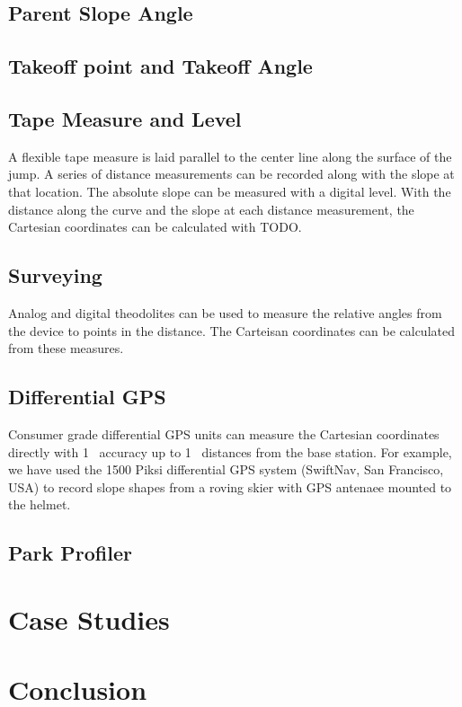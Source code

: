 \documentclass{article}
\begin{document}
\subsection{Parent Slope Angle}
%

\subsection{Takeoff point and Takeoff Angle}
%

\subsection{Tape Measure and Level}
%
A flexible tape measure is laid parallel to the center line along the surface
of the jump. A series of distance measurements can be recorded along with the
slope at that location. The absolute slope can be measured with a digital
level. With the distance along the curve and the slope at each distance
measurement, the Cartesian coordinates can be calculated with TODO.

\subsection{Surveying}
%
Analog and digital theodolites can be used to measure the relative angles from
the device to points in the distance. The Carteisan coordinates can be
calculated from these measures.

\subsection{Differential GPS}
%
Consumer grade differential GPS units can measure the Cartesian coordinates
directly with 1~\SIunit{\centi\meter} accuracy up to 1~\SIunit{\kilo\meter}
distances from the base station. For example, we have used the 1500 Piksi
differential GPS system (SwiftNav, San Francisco, USA) to record slope shapes
from a roving skier with GPS antenaee mounted to the helmet.

\subsection{Park Profiler}

\section{Case Studies}

\section{Conclusion}
\end{document}
